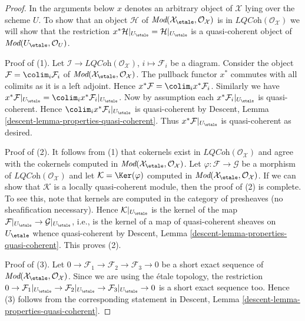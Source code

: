 \begin{proof}
In the arguments below $x$ denotes an arbitrary object of $\mathcal{X}$
lying over the scheme $U$. To show that an object $\mathcal{H}$
of $\textit{Mod}(\mathcal{X}_\etale, \mathcal{O}_\mathcal{X})$ is
in $\textit{LQCoh}(\mathcal{O}_\mathcal{X})$ we will show that the
restriction $x^*\mathcal{H}|_{U_\etale} = \mathcal{H}|_{U_\etale}$
is a quasi-coherent object of $\textit{Mod}(U_\etale, \mathcal{O}_U)$.

\medskip\noindent
Proof of (1). Let $\mathcal{I} \to \textit{LQCoh}(\mathcal{O}_\mathcal{X})$,
$i \mapsto \mathcal{F}_i$ be a diagram.
Consider the object $\mathcal{F} = \colim_i \mathcal{F}_i$ of
$\textit{Mod}(\mathcal{X}_\etale, \mathcal{O}_\mathcal{X})$.
The pullback functor $x^*$ commutes with all colimits
as it is a left adjoint. Hence
$x^*\mathcal{F} = \colim_i x^*\mathcal{F}_i$. Similarly we have
$x^*\mathcal{F}|_{U_\etale} =
\colim_i x^*\mathcal{F}_i|_{U_\etale}$.
Now by assumption each $x^*\mathcal{F}_i|_{U_\etale}$
is quasi-coherent. Hence $\colim_i x^*\mathcal{F}_i|_{U_\etale}$
is quasi-coherent by
Descent, Lemma \ref{descent-lemma-properties-quasi-coherent}.
Thus $x^*\mathcal{F}|_{U_\etale}$ is quasi-coherent as desired.

\medskip\noindent
Proof of (2). It follows from (1) that cokernels exist in
$\textit{LQCoh}(\mathcal{O}_\mathcal{X})$ and agree with the cokernels computed
in $\textit{Mod}(\mathcal{X}_\etale, \mathcal{O}_\mathcal{X})$.
Let $\varphi : \mathcal{F} \to \mathcal{G}$ be a morphism of
$\textit{LQCoh}(\mathcal{O}_\mathcal{X})$ and let
$\mathcal{K} = \Ker(\varphi)$ computed in
$\textit{Mod}(\mathcal{X}_\etale, \mathcal{O}_\mathcal{X})$.
If we can show that $\mathcal{K}$ is a locally quasi-coherent module,
then the proof of (2) is complete. To see this, note that kernels
are computed in the category of presheaves (no sheafification necessary).
Hence $\mathcal{K}|_{U_\etale}$ is the kernel of the map
$\mathcal{F}|_{U_\etale} \to \mathcal{G}|_{U_\etale}$,
i.e., is the kernel of a map of quasi-coherent sheaves on $U_\etale$
whence quasi-coherent by
Descent, Lemma \ref{descent-lemma-properties-quasi-coherent}.
This proves (2).

\medskip\noindent
Proof of (3). Let
$0 \to \mathcal{F}_1 \to \mathcal{F}_2 \to \mathcal{F}_3 \to 0$
be a short exact sequence of
$\textit{Mod}(\mathcal{X}_\etale, \mathcal{O}_\mathcal{X})$.
Since we are using the \'etale topology, the restriction
$0 \to \mathcal{F}_1|_{U_\etale} \to
\mathcal{F}_2|_{U_\etale} \to \mathcal{F}_3|_{U_\etale} \to 0$
is a short exact sequence too. Hence (3) follows from the corresponding
statement in
Descent, Lemma \ref{descent-lemma-properties-quasi-coherent}.


\end{proof}
